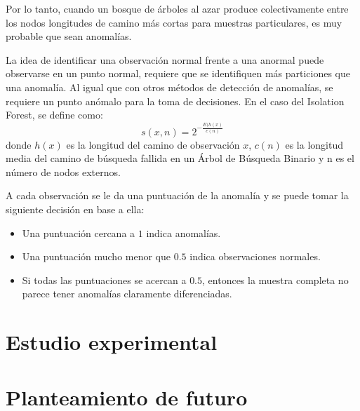 \documentclass[12pt,twoside]{report}
\begin{document}
Por lo tanto, cuando un bosque de árboles al azar produce colectivamente entre los nodos
longitudes de camino más cortas para muestras particulares, es muy probable que sean anomalías.

La idea de identificar una observación normal frente a una anormal puede observarse en un punto
normal, requiere que se identifiquen más particiones que una anomalía.
Al igual que con otros métodos de detección de anomalías, se requiere un punto anómalo para la
toma de decisiones. En el caso del Isolation Forest, se define como:
$$ s(x,n) = 2^{-\frac{E(h(x)}{c(n)}}$$ 
donde $h(x)$ es la longitud del camino de observación $x$, $c(n)$ es la longitud media del camino de búsqueda fallida en un Árbol de Búsqueda Binario y n es el número de nodos externos.

A cada observación se le da una puntuación de la anomalía y se puede tomar la siguiente decisión en base a ella:
\begin{itemize}
	\item Una puntuación cercana a $1$ indica anomalías.
	\item Una puntuación mucho menor que $0.5$ indica observaciones normales.
	\item Si todas las puntuaciones se acercan a $0.5$, entonces la muestra completa no parece tener anomalías claramente diferenciadas.
\end{itemize}

\chapter*{Estudio experimental}

\chapter*{Planteamiento de futuro}


\medskip

\printbibliography[
heading=bibintoc,
title={Referencias}
]
\end{document}
